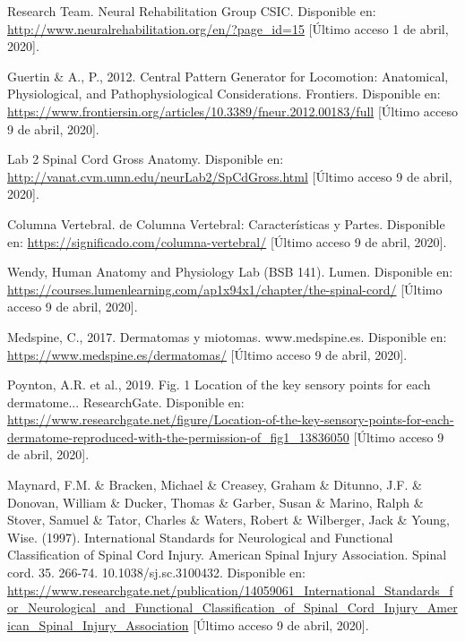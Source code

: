 \begin{thebibliography}{99}

 Research Team. Neural Rehabilitation Group CSIC. Disponible en: \url{http://www.neuralrehabilitation.org/en/?page_id=15} [Último acceso 1 de abril, 2020].


 Guertin \& A., P., 2012. Central Pattern Generator for Locomotion: Anatomical, Physiological, and Pathophysiological Considerations. Frontiers. Disponible en: \url{https://www.frontiersin.org/articles/10.3389/fneur.2012.00183/full} [Último acceso 9 de abril, 2020].

 Lab 2 Spinal Cord Gross Anatomy. Disponible en: \url{http://vanat.cvm.umn.edu/neurLab2/SpCdGross.html} [Último acceso 9 de abril, 2020].

 Columna Vertebral. de Columna Vertebral: Características y Partes. Disponible en: \url{https://significado.com/columna-vertebral/} [Último acceso 9 de abril, 2020].

 Wendy, Human Anatomy and Physiology Lab (BSB 141). Lumen. Disponible en: \url{https://courses.lumenlearning.com/ap1x94x1/chapter/the-spinal-cord/} [Último acceso 9 de abril, 2020].

 Medspine, C., 2017. Dermatomas y miotomas. www.medspine.es.  Disponible en: \url{https://www.medspine.es/dermatomas/} [Último acceso 9 de abril, 2020].

 Poynton, A.R. et al., 2019. Fig. 1 Location of the key sensory points for each dermatome... ResearchGate. Disponible en: \url{https://www.researchgate.net/figure/Location-of-the-key-sensory-points-for-each-dermatome-reproduced-with-the-permission-of_fig1_13836050} [Último acceso 9 de abril, 2020].


 Maynard, F.M. \& Bracken, Michael \& Creasey, Graham \& Ditunno, J.F. \& Donovan, William \& Ducker, Thomas \& Garber, Susan \& Marino, Ralph \& Stover, Samuel \& Tator, Charles \& Waters, Robert \& Wilberger, Jack \& Young, Wise. (1997). International Standards for Neurological and Functional Classification of Spinal Cord Injury. American Spinal Injury Association. Spinal cord. 35. 266-74. 10.1038/sj.sc.3100432.  Disponible en: \url{https://www.researchgate.net/publication/14059061_International_Standards_for_Neurological_and_Functional_Classification_of_Spinal_Cord_Injury_American_Spinal_Injury_Association} [Último acceso 9 de abril, 2020].


\end{thebibliography}
